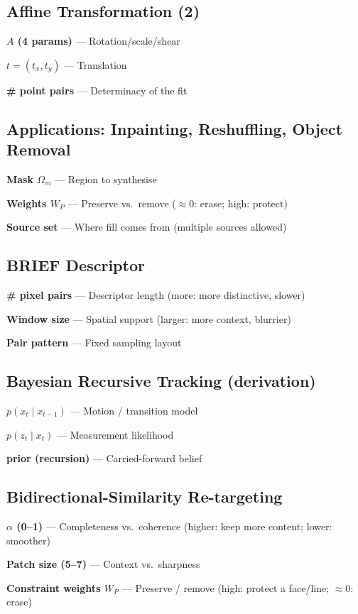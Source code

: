 \documentclass[10pt]{article}
\begin{document}
\subsection*{Affine Transformation (2)}
\textbf{$A$ (4 params)} --- Rotation/scale/shear

\textbf{$t=(t_x,t_y)$} --- Translation

\textbf{\# point pairs} --- Determinacy of the fit

\subsection*{Applications: Inpainting, Reshuffling, Object Removal}
\textbf{Mask $\Omega_m$} --- Region to synthesise

\textbf{Weights $W_P$} --- Preserve vs.\ remove ($\approx0$: erase; high: protect)

\textbf{Source set} --- Where fill comes from (multiple sources allowed)

\subsection*{BRIEF Descriptor}
\textbf{\# pixel pairs} --- Descriptor length (more: more distinctive, slower)

\textbf{Window size} --- Spatial support (larger: more context, blurrier)

\textbf{Pair pattern} --- Fixed sampling layout

\subsection*{Bayesian Recursive Tracking (derivation)}
\textbf{$p(x_t \mid x_{t-1})$} --- Motion / transition model

\textbf{$p(z_t \mid x_t)$} --- Measurement likelihood

\textbf{prior (recursion)} --- Carried-forward belief

\subsection*{Bidirectional-Similarity Re-targeting}
\textbf{$\alpha$ (0--1)} --- Completeness vs.\ coherence (higher: keep more content; lower: smoother)

\textbf{Patch size (5--7)} --- Context vs.\ sharpness

\textbf{Constraint weights $W_P$} --- Preserve / remove (high: protect a face/line; $\approx0$: erase)
\end{document}
